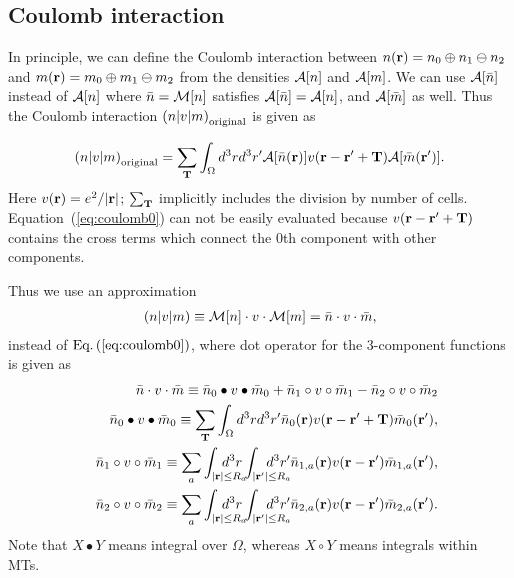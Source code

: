 \documentclass[a4paper,10pt,aip,onecolumn,amsmath,amssymb,floatfix,rmp]{revtex4-1}
\newcommand{\bfr}{{\bf r}}
\newcommand{\bfT}{{\bf T}}
\newcommand{\ooplus}{\oplus}
\newcommand{\oominus}{\ominus}
\def\calR{{\cal A}}
\newcommand{\req}[1]{\mbox{Eq.~\!(\ref{#1})}}
\def\MM{{\cal M}}
\def\inta{\int_{|\bfr|\leq R_a}\!\!\!\!\!\!\!\!\!\!\!\!}
\def\intad{\int_{|\bfr'|\leq R_a}\!\!\!\!\!\!\!\!\!\!\!\!}
\begin{document}
\begin{widetext}
\subsection{Coulomb interaction}
\label{sec:coulomb} In principle, we can define the Coulomb interaction
between $n(\bfr)=n_0\ooplus n_1 \oominus n_2$ and $m(\bfr)=m_0 \ooplus
m_1 \oominus m_2$ from the densities $\calR[n]$ and $\calR[m]$.  We can
use $\calR[\bar{n}]$ instead of $\calR[n]$ where $\bar{n}=\MM[n]$
satisfies $\calR[\bar{n}]=\calR[n]$, and $\calR[\bar{m}]$ as well.  Thus
the Coulomb interaction $\left(n|v|m\right)_{\rm original}$ is given as
\begin{widetext}
\begin{eqnarray}
\left(n|v|m\right)_{\rm original}=\sum_{\bfT} \int_\Omega d^3r d^3r' 
\calR[\bar{n}(\bfr)] v(\bfr-\bfr'+\bfT) \calR[\bar{m}(\bfr')].
\label{eq:coulomb0}
\end{eqnarray}
Here $v(\bfr)=e^2/|\bfr|$; $\sum_{\bfT}$ implicitly includes the
division by number of cells. Equation~(\ref{eq:coulomb0}) can not be
easily evaluated because $v(\bfr-\bfr'+\bfT)$ contains the cross terms
which connect the 0th component with other components.

Thus we use an approximation 
\begin{eqnarray}
\left(n|v|m\right)\equiv\MM[n] \cdot v \cdot \MM[m] = \bar{n} \cdot v \cdot \bar{m}, \label{eq:coulomb}
\end{eqnarray}
instead of $\req{eq:coulomb0}$, where dot operator for the 3-component
functions is given as
\begin{eqnarray}
&&\bar{n} \cdot v \cdot \bar{m} \equiv
\bar{n}_0 \bullet v \bullet \bar{m}_0 + \bar{n}_{1} \circ v \circ
\bar{m}_{1} - \bar{n}_{2} \circ v \circ \bar{m}_{2}\\
&&\bar{n}_0 \bullet v \bullet \bar{m}_0 \equiv \sum_{\bfT} \int_\Omega d^3r d^3r' \bar{n}_0(\bfr)v(\bfr-\bfr'+\bfT) \bar{m}_0(\bfr'), \label{eq:n0vn0}\\
&&\bar{n}_1 \circ v \circ \bar{m}_1 \equiv 
\sum_a \inta d^3r \intad d^3r' \bar{n}_{1,a}(\bfr)v(\bfr-\bfr') \bar{m}_{1,a}(\bfr'), \label{eq:n1vn1}\\
&&\bar{n}_2 \circ v \circ \bar{m}_2 \equiv \sum_a \inta d^3r \intad d^3r' \bar{n}_{2,a}(\bfr)v(\bfr-\bfr') \bar{m}_{2,a}(\bfr'). \label{eq:n2vn2}
\end{eqnarray}
Note that $X \bullet Y$ means integral over $\Omega$, whereas $X \circ
Y$ means integrals within MTs.


\end{widetext}
\end{widetext}
\end{document}
